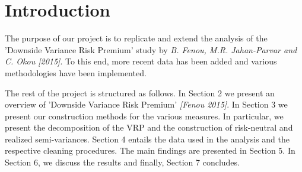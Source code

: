 
\section{Introduction}\label{sec:chapter0}

The purpose of our project is to replicate and extend the analysis of the 'Downside Variance Risk Premium' study by \textit{ B. Fenou, M.R. Jahan-Parvar and C. Okou [2015]}. To this end, more recent data has been added and various methodologies have been implemented. 

The rest of the project is structured as follows. In Section 2 we present an overview of 'Downside Variance Risk Premium' \textit{[Fenou 2015]}. In Section 3 we present our construction methods for the various measures. In particular, we present the decomposition of the VRP and the construction of risk-neutral and realized semi-variances. Section 4 entails the data used in the analysis and the respective cleaning procedures. The main findings are presented in Section 5. In Section 6, we discuss the results and finally, Section 7 concludes.

